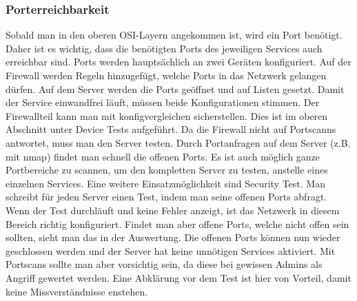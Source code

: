 \documentclass[a4,12pt]{scrartcl}
\begin{document}
\subsubsection{Porterreichbarkeit}
Sobald man in den oberen OSI-Layern angekommen ist, wird ein Port benötigt. Daher ist es wichtig, dass die benötigten Ports des jeweiligen Services auch erreichbar sind.\newline\newline
Ports werden hauptsächlich an zwei Geräten konfiguriert. Auf der Firewall werden Regeln hinzugefügt, welche Ports in das Netzwerk gelangen dürfen. Auf dem Server werden die Ports geöffnet und auf Listen gesetzt. Damit der Service einwandfrei läuft, müssen beide Konfigurationen stimmen. Der Firewallteil kann man mit konfigvergleichen sicherstellen. Dies ist im oberen Abschnitt unter Device Tests aufgeführt.\newline\newline
Da die Firewall nicht auf Portscanns antwortet, muss man den Server testen. Durch Portanfragen auf dem Server (z.B. mit nmap) findet man schnell die offenen Ports. Es ist auch möglich ganze Portbereiche zu scannen, um den kompletten Server zu testen, anstelle eines einzelnen Services.\newline\newline
Eine weitere Einsatzmöglichkeit sind Security Test. Man schreibt für jeden Server einen Test, indem man seine offenen Ports abfragt. Wenn der Test durchläuft und keine Fehler anzeigt, ist das Netzwerk in diesem Bereich richtig konfiguriert. Findet man aber offene Ports, welche nicht offen sein sollten, sieht man das in der Auswertung. Die offenen Ports können nun wieder geschlossen werden und der Server hat keine unnötigen Services aktiviert.\newline\newline
Mit Portscans sollte man aber vorsichtig sein, da diese bei gewissen Admins als Angriff gewertet werden. Eine Abklärung vor dem Test ist hier von Vorteil, damit keine Missverständnisse enstehen.
\end{document}

